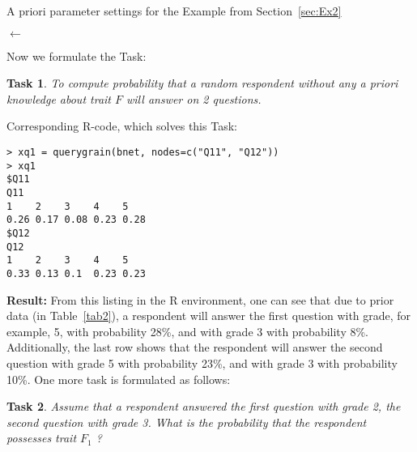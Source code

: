 \documentclass[12pt]{article}
\newtheorem{task}{Task}[section]
\begin{document}
%
\begin{algorithm}[!ht]
\caption{A priori parameter settings for the Example from Section~\ref{sec:Ex2}}
\begin{small}
\begin{algorithmic}
\label{a:alg2}
\State {}
\State {}
\State {}
\State {}$\gets$ 
\State {}
\State {}
\State {}
\State {}
\State {}
\State {}
\State {}
\State {}
\State {}
\State {}
\end{algorithmic}
\end{small}
\end{algorithm}
%
%
%
Now we formulate the Task:
\begin{task}
\label{t:2quest5}
To compute probability that a random respondent without any a priori knowledge about trait $F$ will answer on 2 questions.
\end{task}
%
Corresponding R-code, which solves this Task:
\begin{verbatim}
> xq1 = querygrain(bnet, nodes=c("Q11", "Q12"))
> xq1
$Q11
Q11
1    2    3    4    5 
0.26 0.17 0.08 0.23 0.28 
$Q12
Q12
1    2    3    4    5 
0.33 0.13 0.1  0.23 0.23 
\end{verbatim}
%
\textbf{Result:} From this listing in the R environment, one can see that due to prior data (in Table~\ref{tab2}), a respondent will answer the first question with grade, for example, 5, with probability 28\%, and with grade 3 with probability 8\%. Additionally, the last row shows that the respondent will answer the second question with grade 5 with probability 23\%, and with grade 3 with probability 10\%.
%
One more task is formulated as follows:
\begin{task}
\label{t:2quest1}
Assume that a respondent answered the first question with grade 2, the second question with grade 3. What is the probability that the respondent possesses trait $F_1$ ?\\
\end{task}
\end{document}
